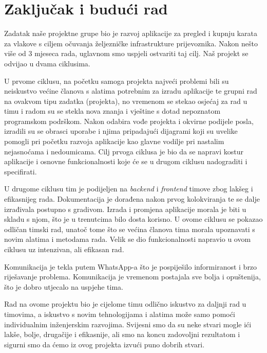 \chapter{Zaključak i budući rad}

		{Zadatak naše projektne grupe bio je razvoj aplikacije za pregled i kupnju karata za vlakove s ciljem očuvanja željezničke infrastrukture prijevoznika. Nakon nešto više od 3 mjeseca rada, uglavnom smo uspjeli ostvariti taj cilj. Naš projekt se odvijao u dvama ciklusima. }

		{U prvome ciklusu, na početku samoga projekta najveći problemi bili su neiskustvo većine članova s alatima potrebnim za izradu aplikacije te grupni rad na ovakvom tipu zadatka (projekta), no vremenom se stekao osjećaj za rad u timu i radom su se stekla nova znanja i vještine s dotad nepoznatom programskom podrškom. Nakon odabira vođe projekta i okvirne podijele posla, izradili su se obrasci uporabe i njima pripadajući dijagrami koji su uvelike pomogli pri početku razvoja aplikacije kao glavne vodilje pri nastalim nejasnoćama i nedoumicama. Cilj prvoga ciklusa je bio da se napravi kostur aplikacije i osnovne funkcionalnosti koje će se u drugom ciklusu nadograditi i specifirati. }

		{U drugome ciklusu tim je podijeljen na \textit{backend} i \textit{frontend} timove zbog lakšeg i efikasnijeg rada. Dokumentacija je dorađena nakon prvog kolokviranja te se dalje izrađivala postupno s gradivom. Izrada i promjena aplikacije morala je biti u skladu s njom, što je u trenutcima bilo dosta korisno. U ovome ciklusu se pokazao odličan timski rad, unatoč tome što se većina članova tima morala upoznavati s novim alatima i metodama rada. Velik se dio funkcionalnosti napravio u ovom ciklusu uz intenzivan, ali efikasan rad.}

		{Komunikacija je tekla putem WhatsApp-a što je pospiješilo informiranost i brzo riješavanje problema. Komunikacija je vremenom postajala sve bolja i opuštenija, što je dobro utjecalo na uspjehe tima. }

		{Rad na ovome projektu bio je cijelome timu odlično iskustvo za daljnji rad u timovima, a iskustvo s novim tehnologijama i alatima može samo pomoći individualnim inženjerskim razvojima. Svijesni smo da su neke stvari mogle ići lakše, bolje, drugačije i efikasnije, ali smo na koncu zadovoljni rezultatom i sigurni smo da ćemo iz ovog projekta izvući puno dobrih stvari. }
		
		\eject 